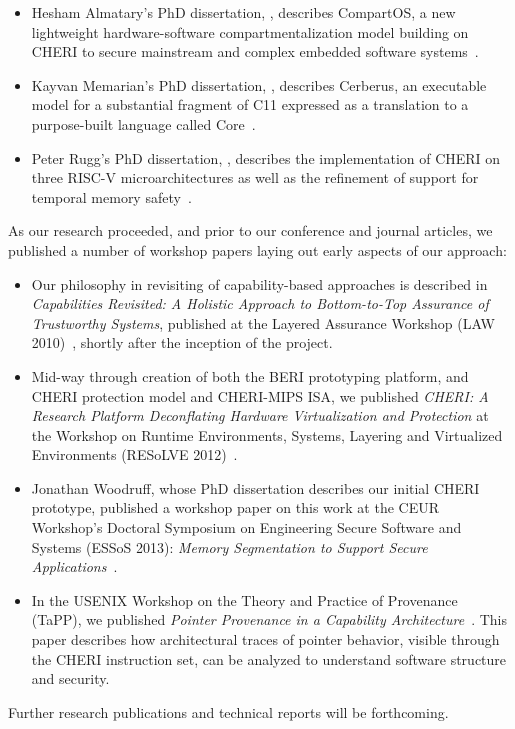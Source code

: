 \begin{itemize}
\item Hesham Almatary's PhD dissertation, ,
  describes CompartOS, a new lightweight hardware-software compartmentalization
  model building on CHERI to secure mainstream and complex embedded software
  systems~\cite{UCAM-CL-TR-976}.

\item Kayvan Memarian's PhD dissertation, ,
  describes Cerberus, an executable model for a substantial fragment
  of C11 expressed as a translation to a purpose-built language called
  Core~\cite{UCAM-CL-TR-981}.

\item Peter Rugg's PhD dissertation, ,
  describes the implementation of CHERI on three RISC-V microarchitectures
  as well as the refinement of support for temporal memory
  safety~\cite{UCAM-CL-TR-984}.
\end{itemize}

As our research proceeded, and prior to our conference and journal articles,
we published a number of workshop papers laying out early aspects of our
approach:

\begin{itemize}
\item Our philosophy in revisiting of capability-based approaches is described
  in {\em Capabilities Revisited: A Holistic Approach to Bottom-to-Top
  Assurance of Trustworthy Systems}, published at the Layered Assurance
  Workshop (LAW 2010)~\cite{NeumannWatson10LAW}, shortly after the inception
  of the project.

\item Mid-way through creation of both the BERI prototyping platform, and
  CHERI protection model and CHERI-MIPS ISA, we published {\em CHERI: A
  Research Platform Deconflating Hardware Virtualization and Protection} at
  the Workshop on Runtime Environments, Systems, Layering and Virtualized
  Environments (RESoLVE 2012)~\cite{watson:cheriresolve2012}.

\item Jonathan Woodruff, whose PhD dissertation describes our initial CHERI
  prototype, published a workshop paper on this work at the CEUR Workshop's
  Doctoral Symposium on Engineering Secure Software and Systems (ESSoS 2013):
  \textit{Memory Segmentation to Support Secure
  Applications}~\cite{NeumannWatson10LAW}.

\item In the USENIX Workshop on the Theory and Practice of Provenance (TaPP),
  we published {\em Pointer Provenance in a Capability
  Architecture}~\cite{mazzinghi:pointer-provenance}.
  This paper describes how architectural traces of pointer behavior, visible
  through the CHERI instruction set, can be analyzed to understand software
  structure and security.
\end{itemize}

\noindent
Further research publications and technical reports will be forthcoming.
